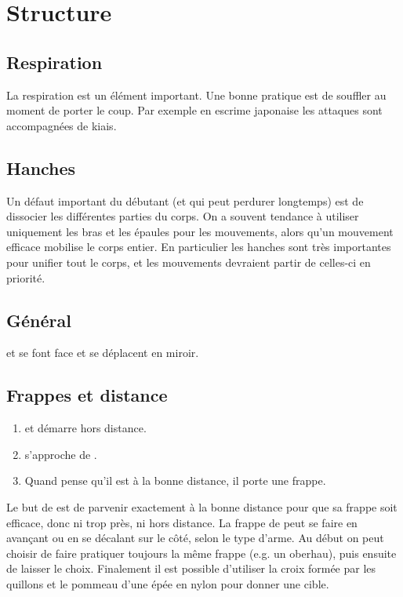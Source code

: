 \chapter{Structure}


\section{Respiration}

La respiration est un élément important. Une bonne pratique est de souffler au moment de porter le coup. Par exemple en escrime japonaise les attaques sont accompagnées de kiais.


\section{Hanches}

Un défaut important du débutant (et qui peut perdurer longtemps) est de dissocier les différentes parties du corps. On a souvent tendance à utiliser uniquement les bras et les épaules pour les mouvements, alors qu'un mouvement efficace mobilise le corps entier. En particulier les hanches sont très importantes pour unifier tout le corps, et les mouvements devraient partir de celles-ci en priorité.


\section{Général}

\cite{kohlweiss:hemac:ringen:2014}

\begin{exercice}
\label{ex:general:miroir}

\A et \D se font face et se déplacent en miroir.
\end{exercice}


\section{Frappes et distance}

\begin{exercice}
\label{ex:frappe-dist:approche-frappe}

\begin{enumerate}
	\item \A et \D démarre hors distance.
	\item \D s'approche de \A.
	\item Quand \A pense qu'il est à la bonne distance, il porte une frappe.
\end{enumerate}

Le but de \A est de parvenir exactement à la bonne distance pour que sa frappe soit efficace, donc ni trop près, ni hors distance.
La frappe de \A peut se faire en avançant ou en se décalant sur le côté, selon le type d'arme.
Au début on peut choisir de faire pratiquer toujours la même frappe (e.g. un oberhau), puis ensuite de laisser le choix.
Finalement il est possible d'utiliser la croix formée par les quillons et le pommeau d'une épée en nylon pour donner une cible.

\end{exercice}


